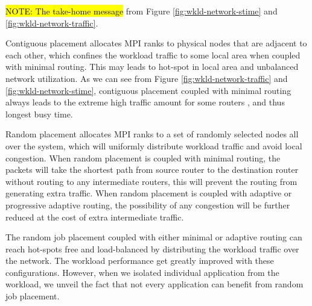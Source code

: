 \documentclass[conference,compsoc]{IEEEtran}
\newcommand{\NOTE}[1]{\hl {NOTE: #1}}
\begin{document}
\NOTE{The take-home message} from Figure \ref{fig:wkld-network-stime} and \ref{fig:wkld-network-traffic}. 

Contiguous placement allocates MPI ranks to physical nodes that are adjacent to each other, which confines the workload traffic to some local area when coupled with minimal routing. This may leads to hot-spot in local area and unbalanced network utilization. As we can see from Figure \ref{fig:wkld-network-traffic} and \ref{fig:wkld-network-stime}, contiguous placement coupled with minimal routing always leads to the extreme high traffic amount for some routers , and thus longest busy time.

Random placement allocates MPI ranks to a set of randomly selected nodes all over the system, which will uniformly distribute workload traffic and avoid local congestion. When random placement is coupled with minimal routing, the packets will take the shortest path from source router to the destination router without routing to any intermediate routers, this will prevent the routing from generating extra traffic. When random placement is coupled with adaptive or progressive adaptive routing, the possibility of any congestion will be further reduced at the cost of extra intermediate traffic. 


The random job placement coupled with either minimal or adaptive routing can reach hot-spots free and load-balanced by distributing the workload traffic over the network. The workload performance get greatly improved with these configurations. However, when we isolated individual application from the workload, we unveil the fact that not every application can benefit from random job placement. 
\end{document}
